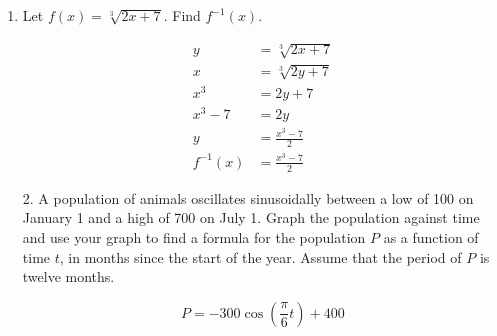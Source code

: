 \documentclass[11pt]{article}
\begin{document}
\pagestyle{empty}
\newsavebox{\quizfront}
\begin{lrbox}{\quizfront}
\begin{minipage}[top][4.5in][t]{\textwidth} \setlength{\parindent}{1.5em}
\drawtitle
\vspace{-0.5in}
\begin{enumerate}

\item Let $f(x) = \sqrt[3]{2x+7}$.  Find $f^{-1}(x)$.

  \vfill
  {\color{blue}

    \begin{align*}
      y &= \sqrt[3]{2x+7}\\
      x &= \sqrt[3]{2y+7}\\
      x^3 &= 2y + 7\\
      x^3 - 7 &= 2y\\
      y &= \frac{x^3 - 7}{2}\\
      f^{-1}(x) &= \frac{x^3 - 7}{2}
    \end{align*}

  }
  \vfill

\end{enumerate}





\end{minipage}
\end{lrbox}

\newsavebox{\quizback}
\begin{lrbox}{\quizback}
\begin{minipage}[top][4.5in][t]{\textwidth} \setlength{\parindent}{1.5em}
\begin{itemize}
\item[2.] A population of animals oscillates sinusoidally between a low of 100 on January 1 and a high of 700 on July 1. Graph the population against time and use your graph to find a formula for the population $P$ as a function of time $t$, in months since the start of the year. Assume that the period of $P$ is twelve months. 

  \vfill
  {\color{blue}
  
  \[
  P = -300\cos\left(\frac{\pi}{6}t\right)+400
  \]
  
  }
  \vfill


\end{itemize}
\end{minipage}
\end{lrbox}

\noindent \usebox{\quizfront}
\vfill
\noindent \usebox{\quizback}

\end{document}
